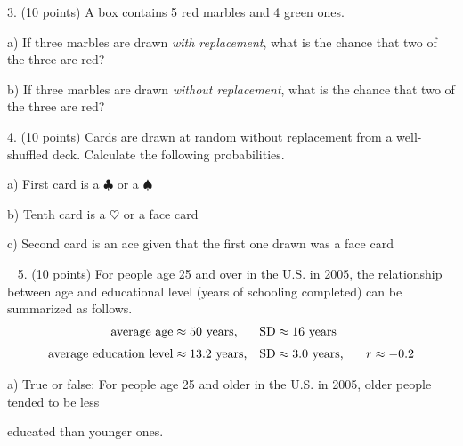 \documentclass[10pt]{article}
\begin{document}
3. (10 points) A box contains 5 red marbles and 4 green ones.   

\hspace{20pt} a) If three marbles are drawn \textit{with replacement}, what is the chance
that two of the three are red?
\vspace{1.2in}

\hspace{20pt} b) If three marbles are drawn \textit{without replacement}, what is the
chance that two of the three are red?
\vspace{1.2in}

4. (10 points) Cards are drawn at random without replacement from a 
well-shuffled deck. Calculate the following probabilities.
\medskip

\hspace{20pt} a) First card is a $\clubsuit$ or a $\spadesuit$
\bigskip\bigskip

\hspace{20pt} b) Tenth card is a $\heartsuit$ or a face card
\bigskip\bigskip

\hspace{20pt} c) Second card is an ace given that the first one drawn was a face card



\vfill
\eject
{\ }
5. (10 points) For people age 25 and over in the U.S. in 2005, the relationship between
age and educational level (years of schooling completed) can be summarized as
follows. 
\begin{align*}
\mbox{average age}         & \approx \mbox{50 years,}    & \mbox{SD} & \approx \mbox{16 years}\\[3pt]
\mbox{average education level}  & \approx \mbox{13.2 years,}  & \mbox{SD} & \approx \mbox{3.0 years,
   \hspace{15pt}} r\approx -0.2
\end{align*}

\hspace{20pt} a) True or false:  For people age 25 and older in the U.S. in 2005, older people tended 
to be less\vspace{-5pt}

\hspace{20pt} \hphantom{a) }  educated than younger ones.
\bigskip
\end{document}
